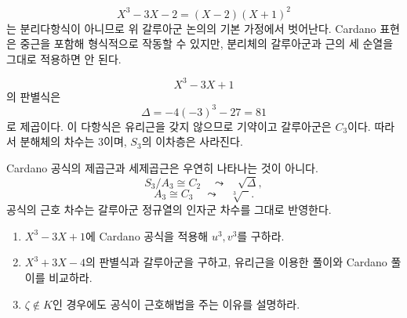 \begin{example}
\[
  X^3-3X-2=(X-2)(X+1)^2
\]
는 분리다항식이 아니므로 위 갈루아군 논의의 기본 가정에서 벗어난다. Cardano 표현은 중근을 포함해 형식적으로 작동할 수 있지만, 분리체의 갈루아군과 근의 세 순열을 그대로 적용하면 안 된다.
\end{example}

\begin{example}
\[
  X^3-3X+1
\]
의 판별식은
\[
  \Delta=-4(-3)^3-27=81
\]
로 제곱이다. 이 다항식은 유리근을 갖지 않으므로 기약이고 갈루아군은 $C_3$이다. 따라서 분해체의 차수는 $3$이며, $S_3$의 이차층은 사라진다.
\end{example}

\begin{keyidea}
Cardano 공식의 제곱근과 세제곱근은 우연히 나타나는 것이 아니다.
\[
  S_3/A_3\cong C_2
  \quad\leadsto\quad
  \sqrt\Delta,
\]
\[
  A_3\cong C_3
  \quad\leadsto\quad
  \sqrt[3]{\phantom{x}}.
\]
공식의 근호 차수는 갈루아군 정규열의 인자군 차수를 그대로 반영한다.
\end{keyidea}

\begin{checkpoint}
\begin{enumerate}[label=(\alph*)]
  \item $X^3-3X+1$에 Cardano 공식을 적용해 $u^3,v^3$를 구하라.
  \item $X^3+3X-4$의 판별식과 갈루아군을 구하고, 유리근을 이용한 풀이와 Cardano 풀이를 비교하라.
  \item $\zeta\notin K$인 경우에도 공식이 근호해법을 주는 이유를 설명하라.
\end{enumerate}
\end{checkpoint}
